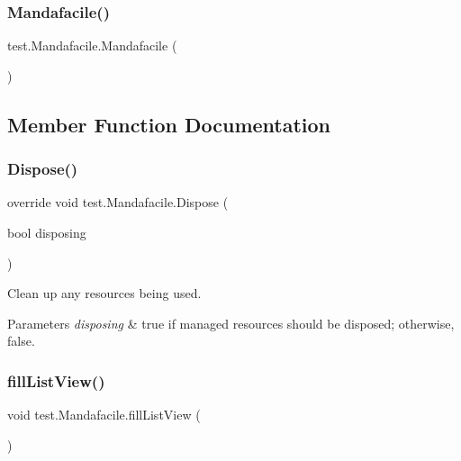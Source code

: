 \subsubsection{\texorpdfstring{Mandafacile()}{Mandafacile()}\hspace{0.1cm}{\footnotesize\ttfamily [2/2]}}
{\footnotesize\ttfamily test.\+Mandafacile.\+Mandafacile (\begin{DoxyParamCaption}{ }\end{DoxyParamCaption})}



\subsection{Member Function Documentation}
\mbox{\label{classtest_1_1_mandafacile_a902a7c1596e3482c4835dbdce757abe2}} 
\subsubsection{\texorpdfstring{Dispose()}{Dispose()}}
{\footnotesize\ttfamily override void test.\+Mandafacile.\+Dispose (\begin{DoxyParamCaption}\item[{bool}]{disposing }\end{DoxyParamCaption})\hspace{0.3cm}{\ttfamily [protected]}}



Clean up any resources being used. 


\begin{DoxyParams}{Parameters}
{\em disposing} & true if managed resources should be disposed; otherwise, false.\\
\hline
\end{DoxyParams}
\mbox{\label{classtest_1_1_mandafacile_a976502d552148bfd98fe1e4daa928032}} 
\subsubsection{\texorpdfstring{fill\+List\+View()}{fillListView()}}
{\footnotesize\ttfamily void test.\+Mandafacile.\+fill\+List\+View (\begin{DoxyParamCaption}{ }\end{DoxyParamCaption})}

